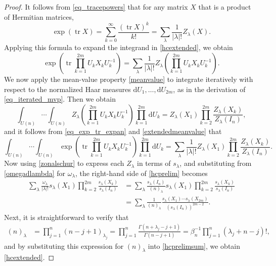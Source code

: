 \documentclass[10pt,a4paper]{amsart}
\numberwithin{equation}{section}
\def\dd{ \mathrm{d}}
\def\tr{\operatorname{tr} }
\begin{document}
\begin{proof}
It follows from \eqref{eq_tracepowers} that for any matrix $X$ that is a product of Hermitian matrices,
\[
\exp(\tr X) = \sum_{k=0}^\infty \frac{(\tr X)^k}{k!} = \sum_\lambda \frac{1}{|\lambda|!} Z_\lambda(X).
\]
Applying this formula to expand the integrand in \eqref{hcextended}, we obtain
\begin{equation}
\exp\left(\tr \prod_{k=1}^{2m} U_k X_k U_k^{-1}\right) = \sum_\lambda \frac{1}{|\lambda|!} Z_\lambda\left(\prod_{k=1}^{2m} U_k X_k U_k^{-1}\right).\label{eq_exp_tr_expan}
\end{equation}
We now apply the mean-value property \eqref{meanvalue} to integrate iteratively with respect to the normalized Haar measures $\dd U_1,\dots,\dd U_{2m}$, as in the derivation of \eqref{eq_iterated_mvp}. Then we obtain
\begin{equation}
\int_{U(n)} \cdots \int_{U(n)} Z_\lambda\left(\prod_{k=1}^{2m} U_kX_kU_k^{-1}\right) \prod_{k=1}^{2m} \dd U_k = Z_\lambda(X_1) \prod_{k=2}^{2m} \frac{Z_\lambda(X_k)}{Z_\lambda(I_n)},\label{extendedmeanvalue}
\end{equation}
and it follows from \eqref{eq_exp_tr_expan} and \eqref{extendedmeanvalue} that
\begin{equation}
\int_{U(n)} \cdots \int_{U(n)} \exp\left(\tr \prod_{k=1}^{2m} U_kX_kU_k^{-1}\right) \prod_{k=1}^{2m} \dd U_k = \sum_\lambda \frac{1}{|\lambda|!} Z_\lambda(X_1) \prod_{k=2}^{2m} \frac{Z_\lambda(X_k)}{Z_\lambda(I_n)}.\label{hcprelim}
\end{equation}
Now using \eqref{zonalschur} to express each $Z_\lambda$ in terms of $s_\lambda$, and substituting from \eqref{omegadlambda} for $\omega_\lambda$, the right-hand side of \eqref{hcprelim} becomes
\begin{align}
\sum_\lambda \frac{\omega_\lambda}{|\lambda|!} s_\lambda(X_1) \prod_{k=2}^{2m} \frac{s_\lambda(X_k)}{s_\lambda(I_n)}
&= \sum_\lambda \frac{s_\lambda(I_n)}{(n)_\lambda} s_\lambda(X_1) \prod_{k=2}^{2m} \frac{s_\lambda(X_k)}{s_\lambda(I_n)} \nonumber \\
&= \sum_\lambda \frac{1}{(n)_\lambda} \frac{s_\lambda(X_1) \cdots s_\lambda(X_{2m})}{(s_\lambda(I_n))^{2m-2}}.\label{hcprelimsum}
\end{align}
Next, it is straightforward to verify that
\begin{align*}
(n)_\lambda &= \prod_{j=1}^n (n-j+1)_{\lambda_j}
= \prod_{j=1}^n \frac{\Gamma(n+\lambda_j-j+1)}{\Gamma(n-j+1)}
= \beta_n^{-1} \prod_{j=1}^n (\lambda_j+n-j)!,
\end{align*}
and by substituting this expression for $(n)_\lambda$ into \eqref{hcprelimsum}, we obtain \eqref{hcextended}.
\end{proof}
\end{document}
